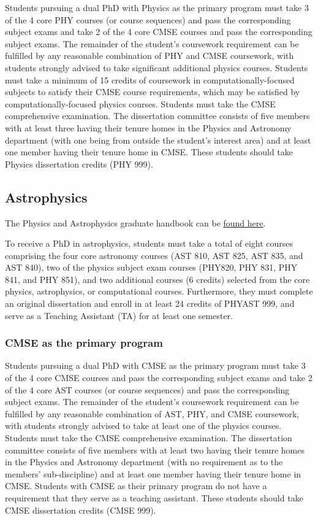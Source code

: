 Students pursuing a dual PhD with Physics as the primary program must
take 3 of the 4 core PHY courses (or course sequences) and pass the
corresponding subject exams and take 2 of the 4 core CMSE courses and
pass the corresponding subject exams.  The remainder of the student's
coursework requirement can be fulfilled by any reasonable combination
of PHY and CMSE coursework, with students strongly advised to take
significant additional physics courses.  Students must take a minimum
of 15 credits of coursework in computationally-focused subjects to
satisfy their CMSE course requirements, which may be satisfied by
computationally-focused physics courses.  Students must take the CMSE
comprehensive examination.  The dissertation committee consists of
five members with at least three having their tenure homes in the
Physics and Astronomy department (with one being from outside the
student's interest area) and at least one member having their tenure
home in CMSE.  These students should take Physics dissertation credits
(PHY 999).

\subsection{Astrophysics}

The Physics and Astrophysics graduate handbook can be \href{http://www.pa.msu.edu/grad/GradHandbook.pdf}{found
  here}.  

To receive a PhD in astrophysics, students must take a total of eight
courses comprising the four core astronomy courses (AST 810, AST 825,
AST 835, and AST 840), two of the physics subject exam courses
(PHY820, PHY 831, PHY 841, and PHY 851), and two additional courses (6
credits) selected from the core physics, astrophysics, or
computational courses.  Furthermore, they must complete an original
dissertation and enroll in at least 24 credits of PHYAST 999, and
serve as a Teaching Assistant (TA) for at least one semester.

\subsubsection{CMSE as the primary program}

Students pursuing a dual PhD with CMSE as the primary program must
take 3 of the 4 core CMSE courses and pass the corresponding subject
exams and take 2 of the 4 core AST courses (or course sequences) and
pass the corresponding subject exams.  The remainder of the student's
coursework requirement can be fulfilled by any reasonable combination
of AST, PHY, and CMSE coursework, with students strongly advised to
take at least one of the physics courses.  Students must take the CMSE
comprehensive examination.  The dissertation committee consists of
five members with at least two having their tenure homes in the
Physics and Astronomy department (with no requirement as to the
members' sub-discipline) and at least one member having their tenure
home in CMSE.  Students with CMSE as their primary program do not have
a requirement that they serve as a teaching assistant.  These students
should take CMSE dissertation credits (CMSE 999).

